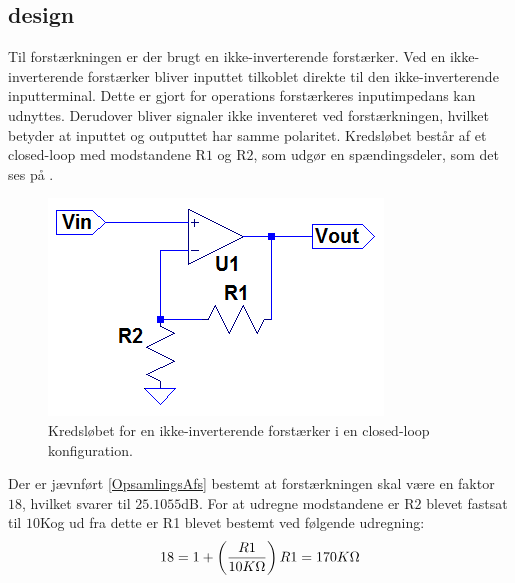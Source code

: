 \subsection{design}
Til forstærkningen er der brugt en ikke-inverterende forstærker. Ved en ikke-inverterende forstærker bliver inputtet tilkoblet direkte til den ikke-inverterende inputterminal. Dette er gjort for operations forstærkeres inputimpedans kan udnyttes. Derudover bliver signaler ikke inventeret ved forstærkningen, hvilket betyder at inputtet og outputtet har samme polaritet. Kredsløbet består af et closed-loop med modstandene R$1$ og R$2$, som udgør en spændingsdeler, som det ses på .
\begin{figure}[H]
\centering
\includegraphics[scale=1]{figures/cProblemloesning/Forstaerker.PNG}
\caption{Kredsløbet for en ikke-inverterende forstærker i en closed-loop konfiguration.}
\label{fig:Forstaerker}
\end{figure} 

Der er jævnført \ref{OpsamlingsAfs} bestemt at forstærkningen skal være en faktor $18$, hvilket svarer til $25.1055$dB. For at udregne modstandene er R$2$ blevet fastsat til $10$K\Omega og ud fra dette er R1 blevet bestemt ved følgende udregning:
\begin{equation} \label{eq:Forstaeker_faktor18}
18=1+\left ( \frac{R1}{10K\Omega } \right )\\
R1 = 170K\Omega
\end{equation}

